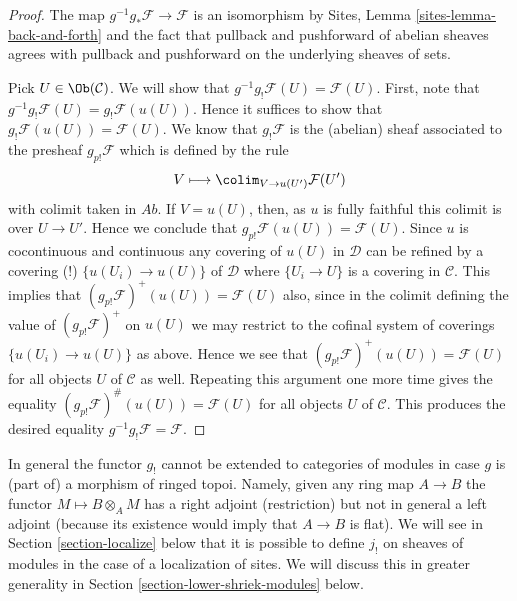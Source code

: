 \begin{proof}
The map $g^{-1}g_*\mathcal{F} \to \mathcal{F}$ is an isomorphism
by Sites, Lemma \ref{sites-lemma-back-and-forth} and the fact that
pullback and pushforward of abelian sheaves agrees with
pullback and pushforward on the underlying sheaves of sets.

\medskip\noindent
Pick $U \in \Ob(\mathcal{C})$. We will show that
$g^{-1}g_!\mathcal{F}(U) = \mathcal{F}(U)$. First, note that
$g^{-1}g_!\mathcal{F}(U) = g_!\mathcal{F}(u(U))$. Hence it suffices
to show that $g_!\mathcal{F}(u(U)) = \mathcal{F}(U)$.
We know that $g_!\mathcal{F}$ is the (abelian) sheaf associated
to the presheaf $g_{p!}\mathcal{F}$ which is defined by the rule
$$
V \longmapsto \colim_{V \to u(U')} \mathcal{F}(U')
$$
with colimit taken in $\textit{Ab}$. If $V = u(U)$, then, as $u$ is
fully faithful this colimit is over $U \to U'$. Hence we conclude
that $g_{p!}\mathcal{F}(u(U)) = \mathcal{F}(U)$.
Since $u$ is cocontinuous and continuous any covering of $u(U)$ in
$\mathcal{D}$ can be refined by a covering (!) $\{u(U_i) \to u(U)\}$
of $\mathcal{D}$ where $\{U_i \to U\}$ is a covering in $\mathcal{C}$.
This implies that $(g_{p!}\mathcal{F})^+(u(U)) = \mathcal{F}(U)$ also,
since in the colimit defining the value of $(g_{p!}\mathcal{F})^+$
on $u(U)$ we may restrict to the cofinal system of coverings
$\{u(U_i) \to u(U)\}$ as above. Hence we see that
$(g_{p!}\mathcal{F})^+(u(U)) = \mathcal{F}(U)$ for all objects $U$
of $\mathcal{C}$ as well. Repeating this argument one more time
gives the equality $(g_{p!}\mathcal{F})^\#(u(U)) = \mathcal{F}(U)$
for all objects $U$ of $\mathcal{C}$. This produces the desired
equality $g^{-1}g_!\mathcal{F} = \mathcal{F}$.
\end{proof}

\begin{remark}
\label{remark-no-extension}
In general the functor $g_!$ cannot be extended to categories of modules
in case $g$ is (part of) a morphism of ringed topoi. Namely, given any
ring map $A \to B$ the functor $M \mapsto B \otimes_A M$ has a right adjoint
(restriction) but not in general a left adjoint (because its existence
would imply that $A \to B$ is flat). We will see in
Section \ref{section-localize}
below that it is possible to define $j_!$ on sheaves of modules
in the case of a localization of sites.
We will discuss this in greater generality in
Section \ref{section-lower-shriek-modules} below.
\end{remark}

